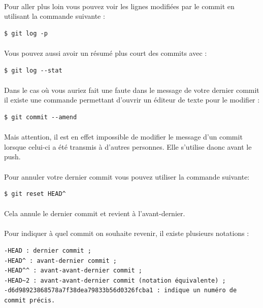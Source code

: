 \documentclass[french, a4paper, 12pt, titlepage]{article}
\begin{document}
\paragraph{}Pour aller plus loin vous pouvez voir les lignes modifiées par le commit en utilisant la commande suivante :
\begin{lstlisting}
$ git log -p
\end{lstlisting}
\paragraph{}Vous pouvez aussi avoir un résumé plus court des commits avec :
\begin{lstlisting}
$ git log --stat
\end{lstlisting}

\paragraph{}Dans le cas où vous auriez fait une faute dans le message de votre dernier commit il existe une commande permettant d'ouvrir un éditeur de texte pour le modifier :
\begin{lstlisting}
$ git commit --amend
\end{lstlisting}
\paragraph{}Mais attention, il est en effet impossible de modifier le message d’un commit lorsque celui-ci a été transmis à d’autres personnes. Elle s'utilise daonc avant le push.
\paragraph{}Pour annuler votre dernier commit vous pouvez utiliser la commande suivante:
\begin{lstlisting}
$ git reset HEAD^
\end{lstlisting}
\paragraph{}Cela annule le dernier commit et revient à l’avant-dernier.
\paragraph{}Pour indiquer à quel commit on souhaite revenir, il existe plusieurs notations :
\begin{lstlisting}
-HEAD : dernier commit ;
-HEAD^ : avant-dernier commit ;
-HEAD^^ : avant-avant-dernier commit ;
-HEAD~2 : avant-avant-dernier commit (notation équivalente) ;
-d6d98923868578a7f38dea79833b56d0326fcba1 : indique un numéro de commit précis.
\end{lstlisting}
\end{document}
